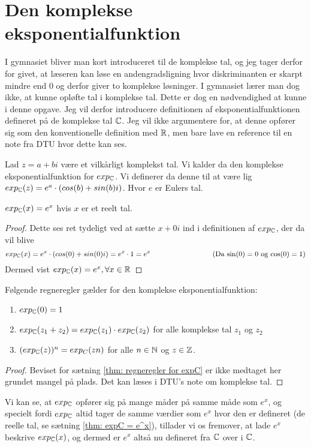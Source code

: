 \section{Den komplekse eksponentialfunktion}
I gymnasiet bliver man kort introduceret til de komplekse tal, og jeg tager derfor for givet, at læseren kan løse en andengradsligning hvor diskriminanten er skarpt mindre end $0$ og derfor giver to komplekse løsninger. 
I gymnasiet lærer man dog ikke, at kunne opløfte tal i komplekse tal. 
Dette er dog en nødvendighed at kunne i denne opgave. 
Jeg vil derfor introducere definitionen af eksponentialfunktionen defineret på de komplekse tal $\mathbb{C}$. 
Jeg vil ikke argumentere for, at denne opfører sig som den konventionelle definition med $\mathbb{R}$, men bare lave en reference til en note fra DTU hvor dette kan ses. 

\begin{definition}\label{def: Den komplekse eksponentialfunktion}

Lad $z=a+bi$ være et vilkårligt komplekst tal. Vi kalder da den komplekse eksponentialfunktion for $exp_{\mathbb{C}}$. 
Vi definerer da denne til at være lig $exp_{\mathbb{C}} (z)=e^{a} \cdot (cos(b) + sin(b)i)$.
Hvor $e$ er Eulers tal. 
\end{definition}

\begin{thm}\label{thm: expC = e^x}
$exp_{\mathbb{C}} (x) = e^x$ hvis $x$ er et reelt tal. 
\end{thm}

\begin{proof}
Dette ses ret tydeligt ved at sætte $x+0i$ ind i definitionen af $exp_{\mathbb{C}}$, der da vil blive $$exp_\mC(x) = e^x \cdot (cos(0)+sin(0)i)=e^x \cdot 1 = e^x \hspace{3cm}
\text{(Da $\sin (0)=0$ og $\cos (0)=1$)}$$
Dermed vist $exp_{\mathbb{C}} (x) = e^x, \forall x \in \mathbb{R}$
\end{proof}

\begin{thm}\label{thm: regneregler for expC}
Følgende regneregler gælder for den komplekse eksponentialfunktion:
\begin{enumerate}
	\item $exp_{\mathbb{C}} (0)=1$
	\item $exp_{\mathbb{C}} (z_1+z_2) = exp_{\mathbb{C}} (z_1) \cdot exp_{\mathbb{C}}(z_2)$ for alle komplekse tal $z_1$ og $z_2$
	\item $(exp_{\mathbb{C}} (z))^n = exp_C (zn)$ for alle $n\in \mathbb{N}$ og $z \in \mathbb{Z}$.
\end{enumerate}
\end{thm}

\begin{proof}
Beviset for sætning \ref{thm: regneregler for expC} er ikke medtaget her grundet mangel på plads. Det kan læses i DTU's note om komplekse tal. 
\end{proof}

Vi kan se, at $exp_{\mathbb{C}}$ opfører sig på mange måder på samme måde som $e^x$, og specielt fordi $exp_{\mathbb{C}}$ altid tager de samme værdier som $e^x$ hvor den er defineret (de reelle tal, se sætning \ref{thm: expC = e^x}), tillader vi os fremover, at lade $e^x$ beskrive $exp_{\mathbb{C}} (x)$, og dermed er $e^x$ altså nu defineret fra $\mathbb{C}$ over i $\mathbb{C}$.